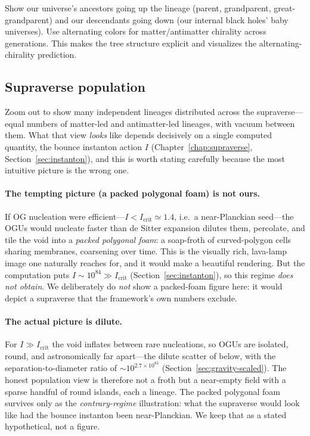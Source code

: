 Show our universe's ancestors going up the lineage (parent, grandparent,
great-grandparent) and our descendants going down (our internal black holes' baby
universes). Use alternating colors for matter/antimatter chirality across
generations. This makes the tree structure explicit and visualizes the
alternating-chirality prediction.

\subsection{Supraverse population}

Zoom out to show many independent lineages distributed across the supraverse---equal
numbers of matter-led and antimatter-led lineages, with vacuum between them. What that
view \emph{looks} like depends decisively on a single computed quantity, the bounce
instanton action $I$ (Chapter~\ref{chap:supraverse}, Section~\ref{sec:instanton}), and
this is worth stating carefully because the most intuitive picture is the wrong one.

\paragraph{The tempting picture (a packed polygonal foam) is not ours.} If OG
nucleation were efficient---$I<I_{\mathrm{crit}}\simeq1.4$, i.e.\ a near-Planckian
seed---the OGUs would nucleate faster than de Sitter expansion dilutes them, percolate,
and tile the void into a \emph{packed polygonal foam}: a soap-froth of curved-polygon
cells sharing membranes, coarsening over time. This is the visually rich, lava-lamp
image one naturally reaches for, and it would make a beautiful rendering. But the
computation puts $I\sim10^{84}\gg I_{\mathrm{crit}}$ (Section~\ref{sec:instanton}), so
this regime \emph{does not obtain}. We deliberately do \emph{not} show a packed-foam
figure here: it would depict a supraverse that the framework's own numbers exclude.

\paragraph{The actual picture is dilute.} For $I\gg I_{\mathrm{crit}}$ the void
inflates between rare nucleations, so OGUs are isolated, round, and astronomically far
apart---the dilute scatter of  below, with the separation-to-diameter
ratio of $\sim10^{2.7\times10^{83}}$ (Section~\ref{sec:gravity-scaled}). The honest
population view is therefore not a froth but a near-empty field with a sparse handful
of round islands, each a lineage. The packed polygonal foam survives only as the
\emph{contrary-regime} illustration: what the supraverse would look like had the bounce
instanton been near-Planckian. We keep that as a stated hypothetical, not a figure.

